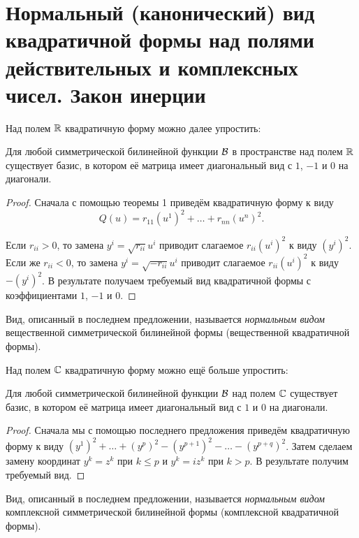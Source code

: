 \section{Нормальный (канонический) вид квадратичной формы над полями действительных и комплексных чисел. Закон инерции}

Над полем $\mathbb{R}$ квадратичную форму можно далее упростить:

\begin{proposal}
    Для любой симметрической билинейной функции $\mathcal{B}$ в пространстве над полем $\mathbb{R}$ существует базис, в котором её матрица имеет диагональный вид с $1$, $-1$ и $0$ на диагонали.
\end{proposal}

\begin{proof}
    Сначала с помощью теоремы 1 приведём квадратичную форму к виду
    \[
        Q(u) = r_{11}(u^1)^2 + \ldots + r_{nn}(u^n)^2.
    \]

    Если $r_{ii} > 0$, то замена $y^i = \sqrt{r_{ii}}u^i$ приводит слагаемое $r_{ii}(u^i)^2$ к виду $(y^i)^2$. Если же $r_{ii} < 0$, то замена $y^i = \sqrt{-r_{ii}}u^i$ приводит слагаемое $r_{ii}(u^i)^2$ к виду $-(y^i)^2$. В результате получаем требуемый вид квадратичной формы с коэффициентами $1$, $-1$ и $0$.
\end{proof}

\begin{definition}
    Вид, описанный в последнем предложении, называется \textit{нормальным видом} вещественной симметрической билинейной формы (вещественной квадратичной формы).
\end{definition}

Над полем $\mathbb{C}$ квадратичную форму можно ещё больше упростить:

\begin{proposal}
    Для любой симметрической билинейной функции $\mathcal{B}$ над полем $\mathbb{C}$ существует базис, в котором её матрица имеет диагональный вид с $1$ и $0$ на диагонали.
\end{proposal}

\begin{proof}
    Сначала мы с помощью последнего предложения приведём квадратичную форму к виду $(y^1)^2 + \ldots + (y^p)^2 - (y^{p + 1})^2 - \ldots - (y^{p + q})^2$. Затем сделаем замену координат $y^k = z^k$ при $k \leqslant p$ и $y^k = iz^k$ при $k > p$. В результате получим требуемый вид.
\end{proof}

\begin{definition}
    Вид, описанный в последнем предложении, называется \textit{нормальным видом} комплексной симметрической билинейной формы (комплексной квадратичной формы).
\end{definition}


